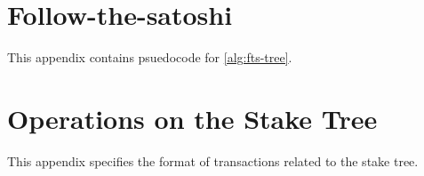 \documentclass{style/kththesis}
\begin{document}
\begin{appendices}
\ifbook \else \onecolumn \fi
{}
\chapter{Follow-the-satoshi}
\label{fts-appendix}

This appendix contains psuedocode for \cref{alg:fts-tree}.



\chapter{Operations on the Stake Tree}
\label{app:stake-tree-transactions}
This appendix specifies the format of transactions related to the stake tree.


\end{appendices}
\end{document}
